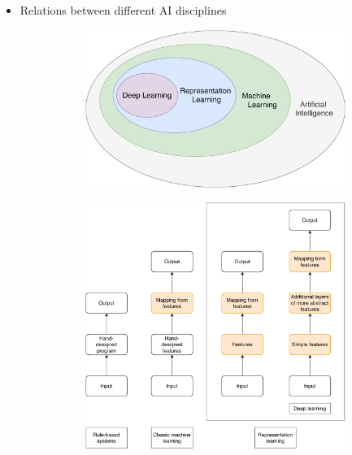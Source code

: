 \documentclass[handout]{beamer}
\begin{document}
\begin{frame}
    \begin{itemize}
        \item Relations between different AI disciplines
        \begin{figure}
            \begin{minipage}{0.45\textwidth}
                \begin{figure}[]
                    \centering
                    \includegraphics[width=\textwidth]{../plots/ai-venn.pdf}
                \end{figure}
            \end{minipage}\hfill
            \begin{minipage}{0.45\textwidth}
                \begin{figure}[]
                    \centering
                    \includegraphics[width=\textwidth]{../plots/ai-flowchart.pdf}

\end{figure}
\end{minipage}
\end{figure}
\end{itemize}
\end{frame}
\end{document}
